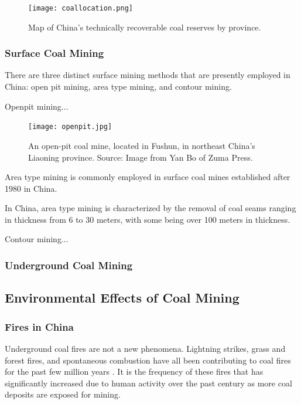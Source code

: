 \begin{figure}[ht]
\centering
    \texttt{[image: coallocation.png]}
    \caption{Map of China's technically recoverable coal reserves by province. }
    \label{fig:coallocation}
\end{figure}

\subsubsection{Surface Coal Mining}

There are three distinct surface mining methods that are presently employed in China: open pit mining, area type mining, and contour mining. 

Openpit mining... 


\begin{figure}[ht]
\centering
    \texttt{[image: openpit.jpg]}
    \caption{An open-pit coal mine, located in Fushun, in northeast China's Liaoning province. Source: Image from Yan Bo of Zuma Press. }
    \label{fig:openpit}
\end{figure}

Area type mining is commonly employed in surface coal mines established after 1980 in China. 

In China, area type mining is characterized by the removal of coal seams ranging in thickness from 6 to 30 meters, with some being over 100 meters in thickness. 

Contour mining...



\citep{ji2012surface}


\subsubsection{Underground Coal Mining}


\subsection{Environmental Effects of Coal Mining}

\subsubsection{Fires in China}

Underground coal fires are not a new phenomena. Lightning strikes, grass and forest fires, and spontaneous combustion have all been contributing to coal fires for the past few million years \citep{ceycoal}. It is the frequency of these fires that has significantly increased due to human activity over the past century as more coal deposits are exposed for mining. 

